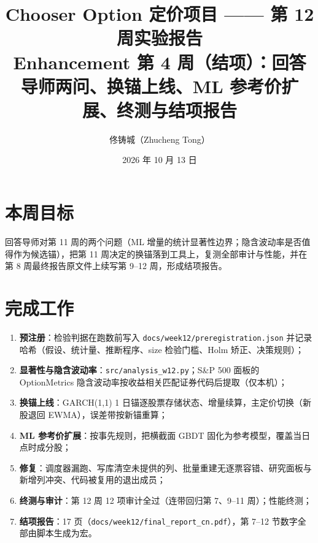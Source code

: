 \documentclass[11pt]{ctexart}
\title{\textbf{Chooser Option 定价项目 —— 第 12 周实验报告}\\
\large Enhancement 第 4 周（结项）：回答导师两问、换锚上线、ML 参考价扩展、终测与结项报告}
\author{佟铸城（Zhucheng Tong）}
\date{2026 年 10 月 13 日}
\begin{document}
\maketitle

\section{本周目标}
回答导师对第 11 周的两个问题（ML 增量的统计显著性边界；隐含波动率是否值得作为候选锚），把第 11 周决定的换锚落到工具上，复测全部审计与性能，并在第 8 周最终报告原文件上续写第 9--12 周，形成结项报告。

\section{完成工作}
\begin{enumerate}
  \item \textbf{预注册}：检验判据在跑数前写入 \texttt{docs/week12/preregistration.json} 并记录哈希（假设、统计量、推断程序、size 检验门槛、Holm 矫正、决策规则）；
  \item \textbf{显著性与隐含波动率}：\texttt{src/analysis\_w12.py}；S\&P 500 面板的 OptionMetrics 隐含波动率按收益相关匹配证券代码后提取（仅本机）；
  \item \textbf{换锚上线}：GARCH(1,1) 1 日锚逐股票存储状态、增量续算，主定价切换（新股退回 EWMA），误差带按新锚重算；
  \item \textbf{ML 参考价扩展}：按事先规则，把横截面 GBDT 固化为参考模型，覆盖当日点时成分股；
  \item \textbf{修复}：调度器漏跑、写库清空未提供的列、批量重建无逐票容错、研究面板与新增列冲突、代码被复用的退出成员；
  \item \textbf{终测与审计}：第 12 周 12 项审计全过（连带回归第 7、9--11 周）；性能终测；
  \item \textbf{结项报告}：17 页（\texttt{docs/week12/final\_report\_cn.pdf}），第 7--12 节数字全部由脚本生成为宏。
\end{enumerate}
\end{document}
